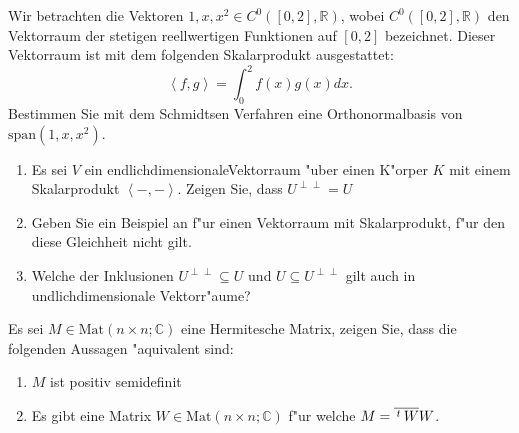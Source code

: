 \documentclass[a4,11pt]{article}
\begin{document}
\vspace*{-17mm}
{
\kopf
}



\begin{aufgabe}[4 Punkte]
Wir betrachten die Vektoren $1,x,x^2 \in C^0([0,2],\mathbb{R})$, wobei $C^0([0,2],\mathbb{R})$ den Vektorraum der stetigen reellwertigen Funktionen auf $[0,2]$ bezeichnet. Dieser Vektorraum ist mit dem folgenden Skalarprodukt ausgestattet:
\[
\left<f,g\right> = \int_0^2 f(x)g(x)dx.
\]
Bestimmen Sie mit dem Schmidtsen Verfahren eine Orthonormalbasis von $\text{span}(1,x,x^2)$.
\end{aufgabe}

\begin{aufgabe}[4 Punkte]
\begin{enumerate}
\item Es sei $V$ ein endlichdimensionaleVektorraum "uber einen K"orper $K$ mit einem Skalarprodukt $\left<-,-\right>$. Zeigen Sie, dass $U^{\perp \perp} = U$
\item Geben Sie ein Beispiel an f"ur einen Vektorraum mit Skalarprodukt, f"ur den diese Gleichheit nicht gilt.
\item Welche der Inklusionen $U^{\perp \perp} \subseteq U$  und $U \subseteq U^{\perp \perp}$ gilt auch in undlichdimensionale Vektorr"aume?
\end{enumerate}
\end{aufgabe}

\begin{aufgabe}[4 Punkte]
Es sei $M \in \text{Mat}(n \times n; \mathbb{C})$ eine Hermitesche Matrix, zeigen Sie, dass die folgenden Aussagen "aquivalent sind:
\begin{enumerate}
\item $M$ ist positiv semidefinit
\item Es gibt eine Matrix $W \in \text{Mat}(n\times n;\mathbb{C})$ f"ur welche $M = \overline{\,^t\!\ W} W$.
\end{enumerate}
\end{aufgabe}
\end{document}
